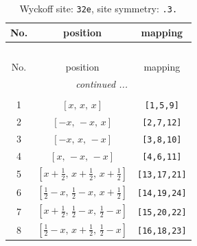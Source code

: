 \documentclass[fleqn,8pt]{jsarticle}
\begin{document}
\renewcommand{\arraystretch}{1.2}
\begin{longtable}{ccc}
\caption{Wyckoff site: {\tt 32e}, site symmetry: {\tt .3.}}
 \\
 \hline \hline
No. & position & mapping \\ \hline \endfirsthead

\multicolumn{2}{l}{\tablename\ \thetable{}} \\
 \hline \hline
No. & position & mapping \\ \hline \endhead

 \hline \hline
\multicolumn{2}{r}{\footnotesize\it continued ...} \\ \endfoot

 \hline \hline
\multicolumn{2}{r}{} \\ \endlastfoot

1 & $\left[ x,\, x,\, x \right]$ & {\tt [1,5,9]} \\ \hline
2 & $\left[ - x,\, - x,\, x \right]$ & {\tt [2,7,12]} \\ \hline
3 & $\left[ - x,\, x,\, - x \right]$ & {\tt [3,8,10]} \\ \hline
4 & $\left[ x,\, - x,\, - x \right]$ & {\tt [4,6,11]} \\ \hline
5 & $\left[ x + \frac{1}{2},\, x + \frac{1}{2},\, x + \frac{1}{2} \right]$ & {\tt [13,17,21]} \\ \hline
6 & $\left[ \frac{1}{2} - x,\, \frac{1}{2} - x,\, x + \frac{1}{2} \right]$ & {\tt [14,19,24]} \\ \hline
7 & $\left[ x + \frac{1}{2},\, \frac{1}{2} - x,\, \frac{1}{2} - x \right]$ & {\tt [15,20,22]} \\ \hline
8 & $\left[ \frac{1}{2} - x,\, x + \frac{1}{2},\, \frac{1}{2} - x \right]$ & {\tt [16,18,23]} \\
\end{longtable}
\renewcommand{\arraystretch}{1.2}
\end{document}
